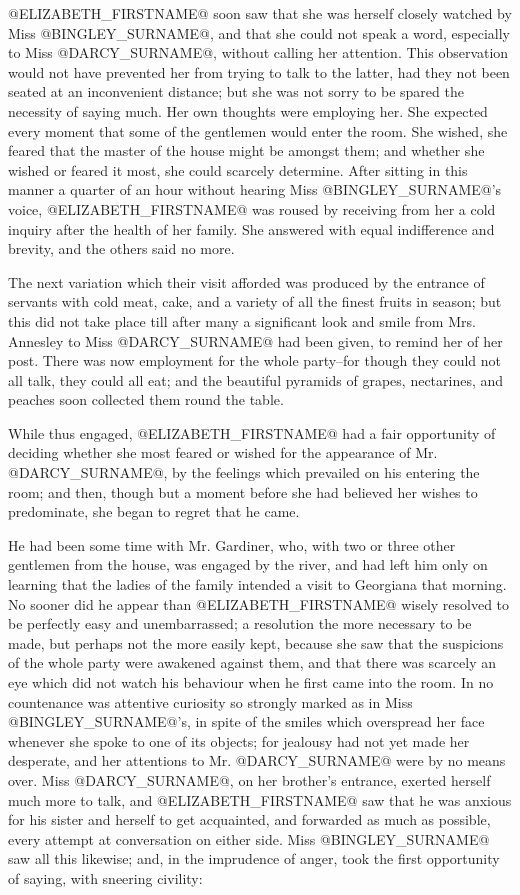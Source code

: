 @ELIZABETH_FIRSTNAME@ soon saw that she was herself closely watched by Miss @BINGLEY_SURNAME@,
and that she could not speak a word, especially to Miss @DARCY_SURNAME@, without
calling her attention. This observation would not have prevented her
from trying to talk to the latter, had they not been seated at an
inconvenient distance; but she was not sorry to be spared the necessity
of saying much. Her own thoughts were employing her. She expected every
moment that some of the gentlemen would enter the room. She wished, she
feared that the master of the house might be amongst them; and whether
she wished or feared it most, she could scarcely determine. After
sitting in this manner a quarter of an hour without hearing Miss
@BINGLEY_SURNAME@'s voice, @ELIZABETH_FIRSTNAME@ was roused by receiving from her a cold
inquiry after the health of her family. She answered with equal
indifference and brevity, and the others said no more.

The next variation which their visit afforded was produced by the
entrance of servants with cold meat, cake, and a variety of all the
finest fruits in season; but this did not take place till after many
a significant look and smile from Mrs. Annesley to Miss @DARCY_SURNAME@ had been
given, to remind her of her post. There was now employment for the whole
party--for though they could not all talk, they could all eat; and the
beautiful pyramids of grapes, nectarines, and peaches soon collected
them round the table.

While thus engaged, @ELIZABETH_FIRSTNAME@ had a fair opportunity of deciding whether
she most feared or wished for the appearance of Mr. @DARCY_SURNAME@, by the
feelings which prevailed on his entering the room; and then, though but
a moment before she had believed her wishes to predominate, she began to
regret that he came.

He had been some time with Mr. Gardiner, who, with two or three other
gentlemen from the house, was engaged by the river, and had left him
only on learning that the ladies of the family intended a visit to
Georgiana that morning. No sooner did he appear than @ELIZABETH_FIRSTNAME@ wisely
resolved to be perfectly easy and unembarrassed; a resolution the more
necessary to be made, but perhaps not the more easily kept, because she
saw that the suspicions of the whole party were awakened against them,
and that there was scarcely an eye which did not watch his behaviour
when he first came into the room. In no countenance was attentive
curiosity so strongly marked as in Miss @BINGLEY_SURNAME@'s, in spite of the
smiles which overspread her face whenever she spoke to one of its
objects; for jealousy had not yet made her desperate, and her attentions
to Mr. @DARCY_SURNAME@ were by no means over. Miss @DARCY_SURNAME@, on her brother's
entrance, exerted herself much more to talk, and @ELIZABETH_FIRSTNAME@ saw that he
was anxious for his sister and herself to get acquainted, and forwarded
as much as possible, every attempt at conversation on either side. Miss
@BINGLEY_SURNAME@ saw all this likewise; and, in the imprudence of anger, took the
first opportunity of saying, with sneering civility:

